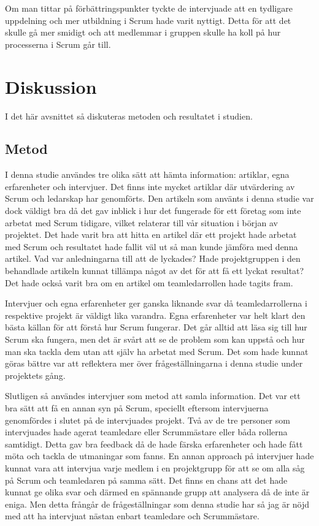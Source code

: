 Om man tittar på förbättringspunkter tyckte de intervjuade att en tydligare uppdelning och mer utbildning i Scrum hade varit nyttigt. Detta för att det skulle gå mer smidigt och att medlemmar i gruppen skulle ha koll på hur processerna i Scrum går till.

\section{Diskussion}
I det här avsnittet så diskuteras metoden och resultatet i studien.

\subsection{Metod}
I denna studie användes tre olika sätt att hämta information: artiklar, egna erfarenheter och intervjuer. 
Det finns inte mycket artiklar där utvärdering av Scrum och ledarskap har genomförts. 
Den artikeln som använts i denna studie var dock väldigt bra då det gav inblick i hur det fungerade för ett företag som inte arbetat med Scrum tidigare, vilket relaterar till vår situation i början av projektet. 
Det hade varit bra att hitta en artikel där ett projekt hade arbetat med Scrum och resultatet hade fallit väl ut så man kunde jämföra med denna artikel. 
Vad var anledningarna till att de lyckades? 
Hade projektgruppen i den behandlade artikeln kunnat tillämpa något av det för att få ett lyckat resultat?
Det hade också varit bra om en artikel om teamledarrollen hade tagits fram. 

Intervjuer och egna erfarenheter ger ganska liknande svar då teamledarrollerna i respektive projekt är väldigt lika varandra.
Egna erfarenheter var helt klart den bästa källan för att förstå hur Scrum fungerar. 
Det går alltid att läsa sig till hur Scrum ska fungera, men det är svårt att se de problem som kan uppstå och hur man ska tackla dem utan att själv ha arbetat med Scrum. 
Det som hade kunnat göras bättre var att reflektera mer över frågeställningarna i denna studie under projektets gång. 

Slutligen så användes intervjuer som metod att samla information. 
Det var ett bra sätt att få en annan syn på Scrum, speciellt eftersom intervjuerna genomfördes i slutet på de intervjuades projekt. 
Två av de tre personer som intervjuades hade agerat teamledare eller Scrummästare eller båda rollerna samtidigt. 
Detta gav bra feedback då de hade färska erfarenheter och hade fått möta och tackla de utmaningar som fanns. 
En annan approach på intervjuer hade kunnat vara att intervjua varje medlem i en projektgrupp för att se om alla såg på Scrum och teamledaren på samma sätt. 
Det finns en chans att det hade kunnat ge olika svar och därmed en spännande grupp att analysera då de inte är eniga. 
Men detta frångår de frågeställningar som denna studie har så jag är nöjd med att ha intervjuat nästan enbart teamledare och Scrummästare.

